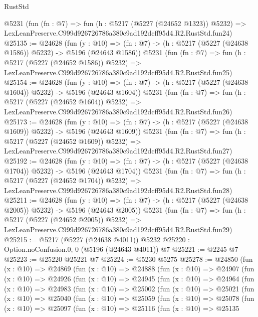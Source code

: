 \begin{lexlean}{RustStd}
\begin{coremodule}
    @5231
    (fun (fn : @7) =>
    fun (h : @5217 (@5227 (@24652 @1323)) @5232) =>
    LexLeanPreserve.C999d926726786a380c9ad192dcff95d4.R2.RustStd.fun24)
@25135 := @24628
    (fun (y : @10) => (fn : @7) -> (h : @5217 (@5227 (@24638 @1586)) @5232) -> @5196 (@24643 @1586))
    @5231
    (fun (fn : @7) =>
    fun (h : @5217 (@5227 (@24652 @1586)) @5232) =>
    LexLeanPreserve.C999d926726786a380c9ad192dcff95d4.R2.RustStd.fun25)
@25154 := @24628
    (fun (y : @10) => (fn : @7) -> (h : @5217 (@5227 (@24638 @1604)) @5232) -> @5196 (@24643 @1604))
    @5231
    (fun (fn : @7) =>
    fun (h : @5217 (@5227 (@24652 @1604)) @5232) =>
    LexLeanPreserve.C999d926726786a380c9ad192dcff95d4.R2.RustStd.fun26)
@25173 := @24628
    (fun (y : @10) => (fn : @7) -> (h : @5217 (@5227 (@24638 @1609)) @5232) -> @5196 (@24643 @1609))
    @5231
    (fun (fn : @7) =>
    fun (h : @5217 (@5227 (@24652 @1609)) @5232) =>
    LexLeanPreserve.C999d926726786a380c9ad192dcff95d4.R2.RustStd.fun27)
@25192 := @24628
    (fun (y : @10) => (fn : @7) -> (h : @5217 (@5227 (@24638 @1704)) @5232) -> @5196 (@24643 @1704))
    @5231
    (fun (fn : @7) =>
    fun (h : @5217 (@5227 (@24652 @1704)) @5232) =>
    LexLeanPreserve.C999d926726786a380c9ad192dcff95d4.R2.RustStd.fun28)
@25211 := @24628
    (fun (y : @10) => (fn : @7) -> (h : @5217 (@5227 (@24638 @2005)) @5232) -> @5196 (@24643 @2005))
    @5231
    (fun (fn : @7) =>
    fun (h : @5217 (@5227 (@24652 @2005)) @5232) =>
    LexLeanPreserve.C999d926726786a380c9ad192dcff95d4.R2.RustStd.fun29)
@25215 := @5217 (@5227 (@24638 @4011)) @5232
@25220 := Option.noConfusion.{0, 0} (@5196 (@24643 @4011)) @7
@25221 := @2245 @7
@25223 := @25220 @25221 @7
@25224 := @5230 @5275
@25278 := @24850
    (fun (x : @10) =>
    @24869
      (fun (x : @10) =>
      @24888
        (fun (x : @10) =>
        @24907
          (fun (x : @10) =>
          @24926
            (fun (x : @10) =>
            @24945
              (fun (x : @10) =>
              @24964
                (fun (x : @10) =>
                @24983
                  (fun (x : @10) =>
                  @25002
                    (fun (x : @10) =>
                    @25021
                      (fun (x : @10) =>
                      @25040
                        (fun (x : @10) =>
                        @25059
                          (fun (x : @10) =>
                          @25078
                            (fun (x : @10) =>
                            @25097
                              (fun (x : @10) =>
                              @25116
                                (fun (x : @10) =>
                                @25135

\end{coremodule}
\end{lexlean}
